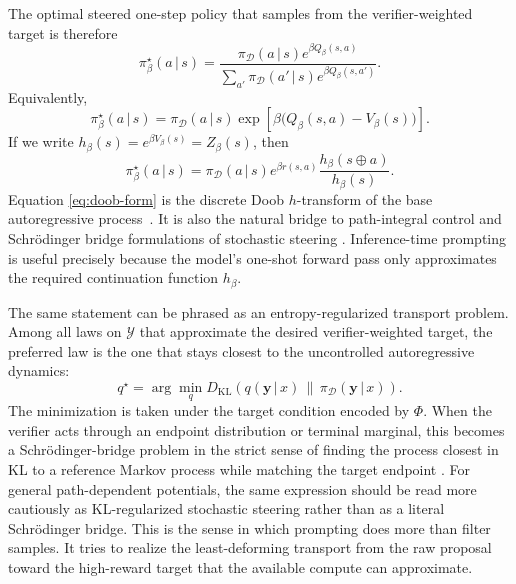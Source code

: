 \documentclass[aps,pre,reprint,superscriptaddress,nofootinbib]{revtex4-2}
\newcommand{\KL}{D_{\mathrm{KL}}}
\newcommand{\given}{\,|\,}
\newcommand{\cY}{\mathcal{Y}}
\newcommand{\y}{\mathbf{y}}
\begin{document}
The optimal steered one-step policy that samples from the verifier-weighted target is therefore
\begin{equation}
\pi^\star_\beta(a\given s)=\frac{\pi_{\mathcal D}(a\given s)e^{\beta Q_\beta(s,a)}}{\sum_{a'}\pi_{\mathcal D}(a'\given s)e^{\beta Q_\beta(s,a')}}.
\label{eq:optimal-soft-policy}
\end{equation}
Equivalently,
\begin{equation}
\pi^\star_\beta(a\given s)=\pi_{\mathcal D}(a\given s)\exp\!\left[\beta\bigl(Q_\beta(s,a)-V_\beta(s)\bigr)\right].
\label{eq:optimal-soft-policy-adv}
\end{equation}
If we write $h_\beta(s)=e^{\beta V_\beta(s)}=Z_\beta(s)$, then
\begin{equation}
\pi^\star_\beta(a\given s)=\pi_{\mathcal D}(a\given s)e^{\beta r(s,a)}
\frac{h_\beta(s\oplus a)}{h_\beta(s)}.
\label{eq:doob-form}
\end{equation}
Equation \eqref{eq:doob-form} is the discrete Doob $h$-transform of the base autoregressive process~\cite{doob1957conditional}.
It is also the natural bridge to path-integral control and Schr\"odinger bridge formulations of stochastic steering \cite{kappen2005path,zhao2024probabilistic,bernton2019schr,lew2023sequential}. 
Inference-time prompting is useful precisely because the model's one-shot forward pass only approximates the required continuation function $h_\beta$.

The same statement can be phrased as an entropy-regularized transport problem. 
Among all laws on $\cY$ that approximate the desired verifier-weighted target, the preferred law is the one that stays closest to the uncontrolled autoregressive dynamics:
\begin{equation}
q^\star = \arg\min_{q} \KL\!\left(q(\y\given x)\,\|\,\pi_{\mathcal D}(\y\given x)\right).
\label{eq:sb-problem}
\end{equation}
The minimization is taken under the target condition encoded by $\Phi$.
When the verifier acts through an endpoint distribution or terminal marginal, this becomes a Schr\"odinger-bridge problem in the strict sense of finding the process closest in KL to a reference Markov process while matching the target endpoint \cite{bernton2019schr}.
For general path-dependent potentials, the same expression should be read more cautiously as KL-regularized stochastic steering rather than as a literal Schr\"odinger bridge.
This is the sense in which prompting does more than filter samples.
It tries to realize the least-deforming transport from the raw proposal toward the high-reward target that the available compute can approximate.
\end{document}
